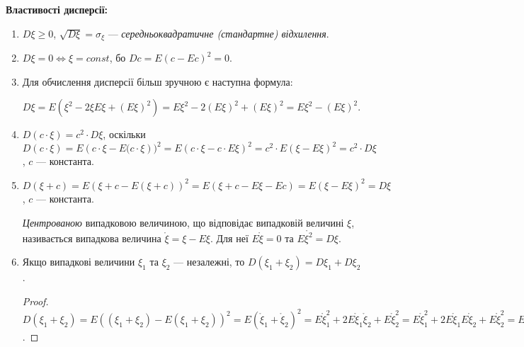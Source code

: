 \noindent \textbf{Властивості дисперсії:}
\begin{enumerate}
    \item $D\xi \geq 0$, $\sqrt{D\xi} = \sigma_\xi$ --- \emph{середньоквадратичне (стандартне) відхилення}.
    \item $D\xi = 0 \Leftrightarrow \xi = const$, бо $D c = E(c - Ec)^2 = 0$.
    \item Для обчислення дисперсії більш зручною є наступна формула:

    $D\xi = E(\xi^2 - 2\xi E\xi +(E\xi)^2) = E\xi^2 - 2(E\xi)^2 + (E\xi)^2 = E\xi^2 - (E\xi)^2$. 
    \item $D(c\cdot \xi) = c^2\cdot D\xi$, оскільки $D(c\cdot \xi) = E\left(c\cdot\xi-E(c\cdot\xi\right))^2 = E\left(c\cdot\xi - c\cdot E\xi\right)^2 = c^2 \cdot E\left(\xi-E\xi\right)^2 = c^2 \cdot D\xi$, $c$ --- константа.
    \item $D(\xi + c) = E(\xi + c - E(\xi + c))^2 = E(\xi + c - E\xi - Ec) = E(\xi - E\xi)^2 = D\xi$, $c$ --- константа.
\begin{definition}
    \emph{Центрованою} випадковою величиною, що відповідає випадковій величині $\xi$, називається 
    випадкова величина $\mathring{\xi} = \xi - E\xi$. Для неї $E\mathring{\xi} = 0$ та 
    $E\mathring{\xi^2} = D\xi$.
\end{definition}
    \item Якщо випадкові величини $\xi_1$ та $\xi_2$ --- незалежні, то
    $D\left(\xi_1 + \xi_2\right) = D\xi_1 + D\xi_2$.
    \begin{proof}
        $D\left(\xi_1 + \xi_2\right) = E((\xi_1 + \xi_2) - E(\xi_1 + \xi_2))^2 = E(\mathring{\xi}_1 + \mathring{\xi}_2)^2 =
        E\mathring{\xi}_1^2 + 2E\mathring{\xi}_1\mathring{\xi}_2 + E\mathring{\xi}_2^2 = 
        E\mathring{\xi}_1^2 + 2E\mathring{\xi}_1 E\mathring{\xi}_2 + E\mathring{\xi}_2^2 =
        E\mathring{\xi}_1^2 + E\mathring{\xi}_2^2 = D\xi_1 + D\xi_2$.
    \end{proof}
\end{enumerate}

